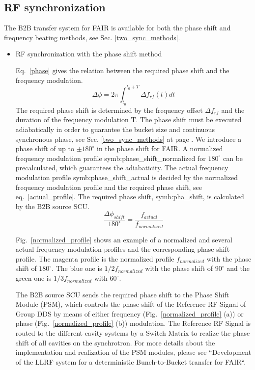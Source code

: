 \subsection{RF synchronization}
The B2B transfer system for FAIR is available for both the phase shift and frequency beating methods, see Sec. \ref{two_sync_methods}.
\begin{itemize}
\item RF synchronization with the phase shift method

Eq.~\ref{phase} gives the relation between the required phase shift and the frequency modulation. 
\begin{equation}
\Delta \phi= 2\pi \int_{t_0}^{t_0+T} \Delta f_{rf}(t)dt \label{phase}
\end{equation}
The required phase shift is determined by the frequency offset $\Delta f_{rf}$ and the duration of the frequency modulation T. The phase shift must be executed adiabatically in order to guarantee the bucket size and continuous synchronous phase, see Sec. \ref{two_sync_methods} at page \pageref{3_criteria}. We introduce a phase shift of up to $\pm 180^\circ$ in the phase shift for FAIR. A normalized frequency modulation profile \gls{symb:phase_shift_normalized} for $180^\circ$ can be precalculated, which guarantees the adiabaticity. The actual frequency modulation profile \gls{symb:phase_shift_actual} is decided by the normalized frequency modulation profile and the required phase shift, see eq.~\ref{actual_profile}. The required phase shift, \gls{symb:pha_shift}, is calculated by the B2B source SCU.
\begin{equation}
\frac{\Delta \phi_{shift}}{180^\circ}= \frac{f_{actual}}{f_{normalized}} \label{actual_profile}
\end{equation}

Fig.~\ref{normalized_profile} shows an example of a normalized and several actual frequency  modulation profiles and the corresponding phase shift profile. The magenta profile is the normalized profile $f_{normalized}$ with the phase shift of $180^\circ$. The blue one is $1/2f_{normalized}$ with the phase shift of $90^\circ$ and the green one is $1/3f_{normalized}$ with $60^\circ$. 

The B2B source SCU sends the required phase shift to the Phase Shift Module (\gls{PSM}), which controls the phase shift of the Reference RF Signal of Group DDS by means of either frequency (Fig.~\ref{normalized_profile} (a)) or phase (Fig.~\ref{normalized_profile} (b)) modulation. The Reference RF Signal is routed to the different cavity systems by a Switch Matrix to realize the phase shift of all cavities on the synchrotron. For more details about the implementation and realization of the PSM modules, please see ``Development of the LLRF system for a deterministic Bunch-to-Bucket transfer for FAIR``.
                       

\end{itemize}
